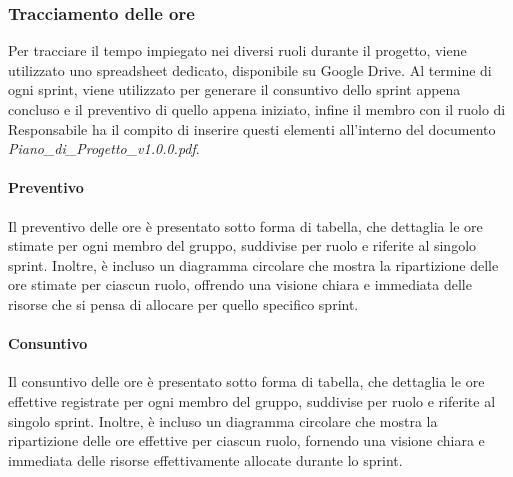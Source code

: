 \documentclass[10pt]{article}
\begin{document}
\begin{justify}
    \subsubsection{Tracciamento delle ore}
    Per tracciare il tempo impiegato nei diversi ruoli durante il progetto, viene utilizzato uno spreadsheet dedicato, disponibile su Google Drive. Al termine di ogni sprint, viene utilizzato per generare il consuntivo dello sprint appena concluso e il preventivo di quello appena iniziato, infine il membro con il ruolo di Responsabile ha il compito di inserire questi elementi all'interno del documento \textit{Piano\_di\_Progetto\_v1.0.0.pdf}.

        \paragraph{Preventivo}
        Il preventivo delle ore è presentato sotto forma di tabella, che dettaglia le ore stimate per ogni membro del gruppo, suddivise per ruolo e riferite al singolo sprint. Inoltre, è incluso un diagramma circolare che mostra la ripartizione delle ore stimate per ciascun ruolo, offrendo una visione chiara e immediata delle risorse che si pensa di allocare per quello specifico sprint.

        \paragraph{Consuntivo}
        Il consuntivo delle ore è presentato sotto forma di tabella, che dettaglia le ore effettive registrate per ogni membro del gruppo, suddivise per ruolo e riferite al singolo sprint. Inoltre, è incluso un diagramma circolare che mostra la ripartizione delle ore effettive per ciascun ruolo, fornendo una visione chiara e immediata delle risorse effettivamente allocate durante lo sprint.


\end{justify}
\end{document}

